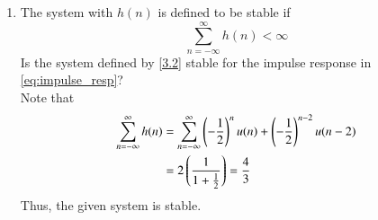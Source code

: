 \documentclass[journal,12pt,twocolumn]{IEEEtran}
\renewcommand\thesection{\arabic{section}}
\begin{document}
\begin{enumerate}[label=\thesection.\arabic*
,ref=\thesection.\theenumi]
\begin{figure}[!ht]
\caption{$h(n)$ as the inverse of $H(z)$}
\label{fig:hn}
\end{figure}
$h(n)$ is bounded and convergent.
%
\item The system with $h(n)$ is defined to be stable if
\begin{equation}
\sum_{n=-\infty}^{\infty}h(n) < \infty
\end{equation}
Is the system defined by \eqref{3.2} stable for the impulse response in \eqref{eq:impulse_resp}?\\
%
\solution Note that
\begin{align}
	\sum_{n=-\infty}^\infty h(n) &= \sum_{n=-\infty}^\infty \left(-\frac{1}{2}\right)^nu(n)+\left(-\frac{1}{2}\right)^{n-2}u(n-2)\\
	&= 2\left(\frac{1}{1+\frac{1}{2}}\right) = \frac{4}{3}
\end{align}
Thus, the given system is stable.


\end{enumerate}
\end{document}
